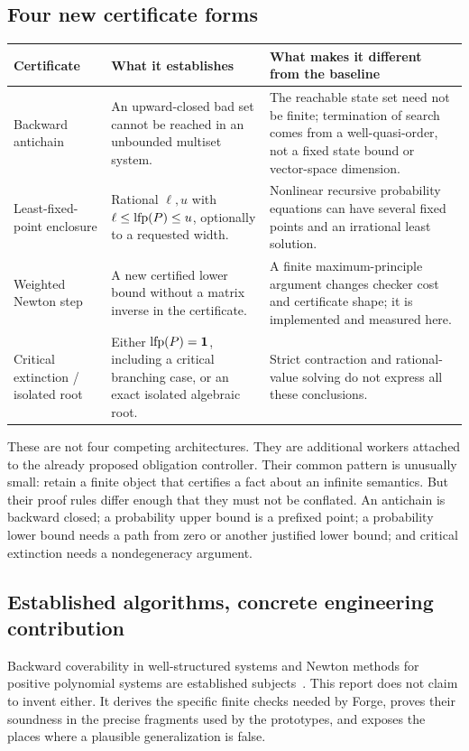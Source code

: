 \subsection{Four new certificate forms}
\begin{table}[htbp]
\centering\small
\begin{tabular}{P{0.21\textwidth}P{0.34\textwidth}P{0.36\textwidth}}
\toprule
Certificate & What it establishes & What makes it different from the baseline \\
\midrule
Backward antichain & An upward-closed bad set cannot be reached in an unbounded multiset system. & The reachable state set need not be finite; termination of search comes from a well-quasi-order, not a fixed state bound or vector-space dimension.\\[4pt]
Least-fixed-point enclosure & Rational $\ell,u$ with $\ell\le\operatorname{lfp}(P)\le u$, optionally to a requested width. & Nonlinear recursive probability equations can have several fixed points and an irrational least solution.\\[4pt]
Weighted Newton step & A new certified lower bound without a matrix inverse in the certificate. & A finite maximum-principle argument changes checker cost and certificate shape; it is implemented and measured here.\\[4pt]
Critical extinction / isolated root & Either $\operatorname{lfp}(P)=\mathbf 1$, including a critical branching case, or an exact isolated algebraic root. & Strict contraction and rational-value solving do not express all these conclusions.\\
\bottomrule
\end{tabular}
\end{table}

These are not four competing architectures. They are additional workers attached to the already proposed obligation controller. Their common pattern is unusually small: retain a finite object that certifies a fact about an infinite semantics. But their proof rules differ enough that they must not be conflated. An antichain is backward closed; a probability upper bound is a prefixed point; a probability lower bound needs a path from zero or another justified lower bound; and critical extinction needs a nondegeneracy argument.

\subsection{Established algorithms, concrete engineering contribution}
Backward coverability in well-structured systems and Newton methods for positive polynomial systems are established subjects~\cite{finkel-schnoebelen,esparza-kiefer-luttenberger,etessami-stewart-yannakakis}. This report does not claim to invent either. It derives the specific finite checks needed by Forge, proves their soundness in the precise fragments used by the prototypes, and exposes the places where a plausible generalization is false.

